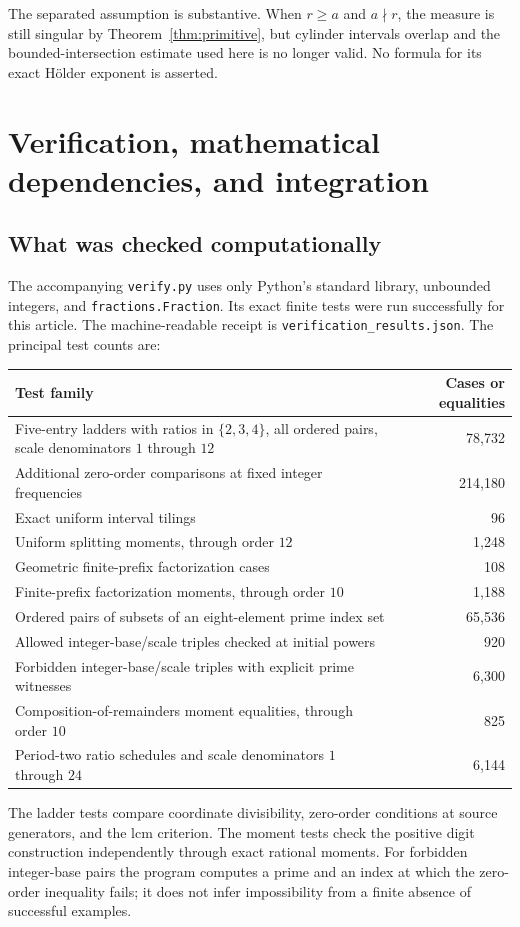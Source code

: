 \documentclass[11pt,a4paper]{article}
\theoremstyle{definition}
\theoremstyle{remark}
\begin{document}
The separated assumption is substantive. When $r\ge a$ and $a\nmid r$,
the measure is still singular by Theorem~\ref{thm:primitive}, but cylinder
intervals overlap and the bounded-intersection estimate used here is no
longer valid. No formula for its exact H\"older exponent is asserted.

\section{Verification, mathematical dependencies, and integration}
\label{sec:verification}

\subsection{What was checked computationally}
The accompanying \texttt{verify.py} uses only Python's standard library,
unbounded integers, and \texttt{fractions.Fraction}. Its exact finite tests
were run successfully for this article. The machine-readable receipt is
\texttt{verification\_results.json}. The principal test counts are:
\begin{center}
\begin{tabular}{@{}>{\raggedright\arraybackslash}p{10.1cm}r@{}}
\toprule
Test family & Cases or equalities\\
\midrule
Five-entry ladders with ratios in $\{2,3,4\}$, all ordered pairs,
scale denominators $1$ through $12$ & 78,732\\
Additional zero-order comparisons at fixed integer frequencies & 214,180\\
Exact uniform interval tilings & 96\\
Uniform splitting moments, through order $12$ & 1,248\\
Geometric finite-prefix factorization cases & 108\\
Finite-prefix factorization moments, through order $10$ & 1,188\\
Ordered pairs of subsets of an eight-element prime index set & 65,536\\
Allowed integer-base/scale triples checked at initial powers & 920\\
Forbidden integer-base/scale triples with explicit prime witnesses & 6,300\\
Composition-of-remainders moment equalities, through order $10$ & 825\\
Period-two ratio schedules and scale denominators $1$ through $24$ & 6,144\\
\bottomrule
\end{tabular}
\end{center}
The ladder tests compare coordinate divisibility, zero-order conditions at
source generators, and the lcm criterion. The moment tests check the
positive digit construction independently through exact rational moments.
For forbidden integer-base pairs the program computes a prime and an index
at which the zero-order inequality fails; it does not infer impossibility
from a finite absence of successful examples.
\end{document}
